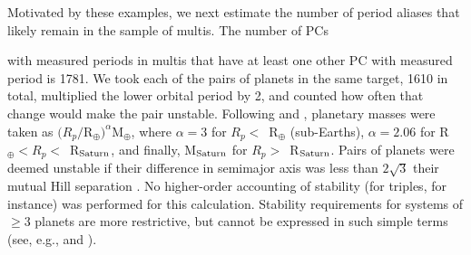\documentclass{aastex62}
\begin{document}
Motivated by these examples, we next estimate the number of period aliases that likely remain in the sample of multis. The number of PCs {with measured periods in multis that have at least one other PC with measured period is 1781. We took each of the pairs of planets in the same target, 1610 in total, multiplied the lower orbital period by 2, and counted how often that change would make the pair unstable. Following \cite{Lissauer:2011b} and \cite{Fabrycky:2014}, planetary masses were taken as  $(R_p/$R$_\oplus)^\alpha$M$_\oplus$, where $\alpha=3$ for $R_p<$~R$_\oplus$ (sub-Earths), $\alpha=2.06$ for R$_\oplus<R_p<$~R$_{\rm Saturn}$, and finally, M$_{\rm Saturn}$ for $R_p>$~R$_{\rm Saturn}$. Pairs of planets were deemed unstable if their difference in semimajor axis was less than $2\sqrt{3}$ their mutual Hill separation \citep{Gladman:1993}. No higher-order accounting of stability (for triples, for instance) was performed for this calculation. Stability requirements for systems of $\geq 3$ planets are more restrictive, but cannot be expressed in such simple terms (see, e.g., \citealt{Petit:2020} and \citealt{Lissauer:2021}).


}
\end{document}
